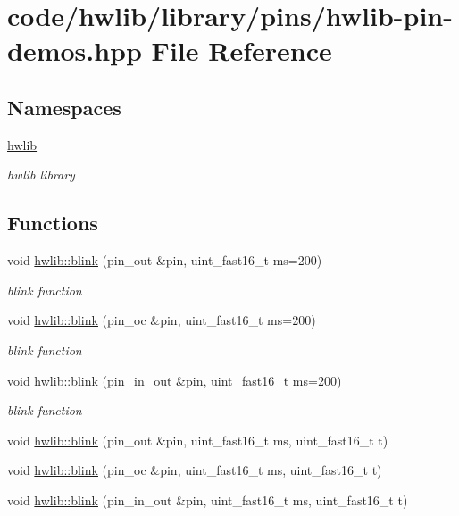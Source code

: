 \hypertarget{hwlib-pin-demos_8hpp}{}\section{code/hwlib/library/pins/hwlib-\/pin-\/demos.hpp File Reference}
\label{hwlib-pin-demos_8hpp}
\subsection*{Namespaces}
\begin{DoxyCompactItemize}
\item 
 \hyperlink{namespacehwlib}{hwlib}
\begin{DoxyCompactList}\small\item\em hwlib library \end{DoxyCompactList}\end{DoxyCompactItemize}
\subsection*{Functions}
\begin{DoxyCompactItemize}
\item 
void \hyperlink{namespacehwlib_a07ec2b554dc2b3f7e20acfa07158bbdc}{hwlib\+::blink} (pin\+\_\+out \&pin, uint\+\_\+fast16\+\_\+t ms=200)
\begin{DoxyCompactList}\small\item\em blink function \end{DoxyCompactList}\item 
void \hyperlink{namespacehwlib_a4da0954a246d92ba3e62f22fa52bf3a3}{hwlib\+::blink} (pin\+\_\+oc \&pin, uint\+\_\+fast16\+\_\+t ms=200)
\begin{DoxyCompactList}\small\item\em blink function \end{DoxyCompactList}\item 
void \hyperlink{namespacehwlib_a76528f4237960700ba546384da8d493d}{hwlib\+::blink} (pin\+\_\+in\+\_\+out \&pin, uint\+\_\+fast16\+\_\+t ms=200)
\begin{DoxyCompactList}\small\item\em blink function \end{DoxyCompactList}\item 
void \hyperlink{namespacehwlib_ab23acad933a5226df042258d51580e12}{hwlib\+::blink} (pin\+\_\+out \&pin, uint\+\_\+fast16\+\_\+t ms, uint\+\_\+fast16\+\_\+t t)
\item 
void \hyperlink{namespacehwlib_a15c7dfa69658f68b4c264274f88cfa07}{hwlib\+::blink} (pin\+\_\+oc \&pin, uint\+\_\+fast16\+\_\+t ms, uint\+\_\+fast16\+\_\+t t)
\item 
void \hyperlink{namespacehwlib_a7a664ac66df071c75f502006e184101c}{hwlib\+::blink} (pin\+\_\+in\+\_\+out \&pin, uint\+\_\+fast16\+\_\+t ms, uint\+\_\+fast16\+\_\+t t)
\end{DoxyCompactItemize}
